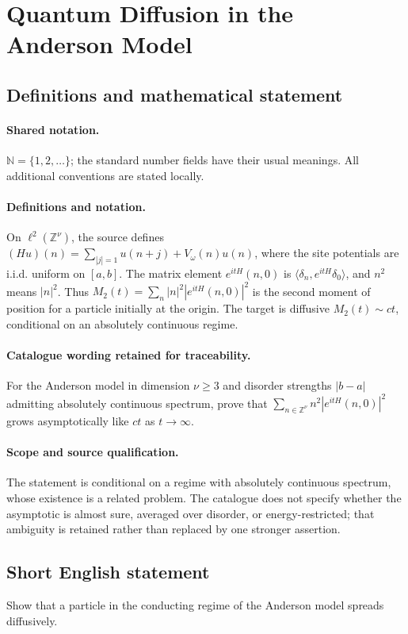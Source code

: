 \documentclass[11pt]{article}
\begin{document}
\section{Quantum Diffusion in the Anderson Model}\label{statement}

\subsection{Definitions and mathematical statement}

\paragraph{Shared notation.}$\mathbb N=\{1,2,\ldots\}$; the standard number fields have their usual meanings. All additional conventions are stated locally.


\paragraph{Definitions and notation.}On $\ell^2(\mathbb Z^\nu)$, the source defines $(Hu)(n)=\sum_{|j|=1}u(n+j)+V_\omega(n)u(n)$, where the site potentials are i.i.d. uniform on $[a,b]$. The matrix element $e^{itH}(n,0)$ is $\langle\delta_n,e^{itH}\delta_0\rangle$, and $n^2$ means $|n|^2$. Thus $M_2(t)=\sum_n|n|^2|e^{itH}(n,0)|^2$ is the second moment of position for a particle initially at the origin. The target is diffusive $M_2(t)\sim ct$, conditional on an absolutely continuous regime.

\paragraph{Catalogue wording retained for traceability.}
For the Anderson model in dimension $\nu\geq3$ and disorder strengths $|b-a|$ admitting absolutely continuous spectrum, prove that $\sum_{n\in\mathbb Z^\nu} n^2|e^{itH}(n,0)|^2$ grows asymptotically like $ct$ as $t\to\infty$.
\paragraph{Scope and source qualification.}The statement is conditional on a regime with absolutely continuous spectrum, whose existence is a related problem. The catalogue does not specify whether the asymptotic is almost sure, averaged over disorder, or energy-restricted; that ambiguity is retained rather than replaced by one stronger assertion.
\subsection{Short English statement}
Show that a particle in the conducting regime of the Anderson model spreads diffusively.
\end{document}
